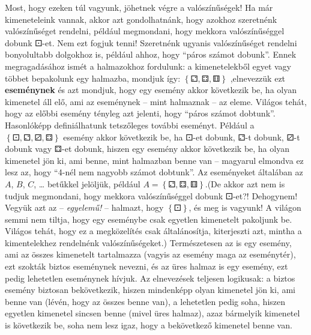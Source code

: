 \documentclass[magyar,]{book}
\begin{document}
Most, hogy ezeken túl vagyunk, jöhetnek végre a valószínűségek! Ha már kimeneteleink vannak, akkor azt gondolhatnánk, hogy azokhoz szeretnénk valószínűséget rendelni, például megmondani, hogy mekkora valószínűséggel dobunk ⚀-et. Nem ezt fogjuk tenni! Szeretnénk ugyanis valószínűséget rendelni bonyolultabb dolgokhoz is, például ahhoz, hogy \enquote{páros számot dobunk}. Ennek megragadásához ismét a halmazokhoz fordulunk: a kimenetelekből egyet vagy többet bepakolunk egy halmazba, mondjuk így: \(\left\{⚁,⚃,⚅\right\}\) ,elnevezzük ezt \textbf{eseménynek} és azt mondjuk, hogy egy esemény akkor következik be, ha olyan kimenetel áll elő, ami az eseménynek -- mint halmaznak -- az eleme. Világos tehát, hogy az előbbi esemény tényleg azt jelenti, hogy \enquote{páros számot dobtunk}. Hasonlóképp definiálhatunk tetszőleges további eseményt. Például a \(\left\{⚀,⚁,⚂,⚃\right\}\) esemény akkor következik be, ha ⚀-et dobunk, ⚁-t dobunk, ⚂-t dobunk vagy ⚃-et dobunk, hiszen egy esemény akkor következik be, ha olyan kimenetel jön ki, ami benne, mint halmazban benne van -- magyarul elmondva ez lesz az, hogy \enquote{4-nél nem nagyobb számot dobtunk}. Az eseményeket általában az \(A\), \(B\), \(C\), \ldots{} betűkkel jelöljük, például \(A=\left\{⚁,⚃,⚅\right\}\).(De akkor azt nem is tudjuk megmondani, hogy mekkora valószínűséggel dobunk ⚀-et?! Dehogynem! Vegyük azt az -- \emph{egyelemű!} -- halmazt, hogy \(\left\{⚀\right\}\), és meg is vagyunk! A világon semmi nem tiltja, hogy egy eseménybe csak egyetlen kimenetelt pakoljunk be. Világos tehát, hogy ez a megközelítés csak általánosítja, kiterjeszti azt, mintha a kimentelekhez rendelnénk valószínűségeket.) Természetesen az is egy esemény, ami az összes kimenetelt tartalmazza (vagyis az esemény maga az eseménytér), ezt szokták biztos eseménynek nevezni, és az üres halmaz is egy esemény, ezt pedig lehetetlen eseménynek hívjuk. Az elnevezések teljesen logikusak: a biztos esemény biztosan bekövetkezik, hiszen mindenképp olyan kimenetel jön ki, ami benne van (lévén, hogy az összes benne van), a lehetetlen pedig soha, hiszen egyetlen kimenetel sincsen benne (mivel üres halmaz), azaz bármelyik kimenetel is következik be, soha nem lesz igaz, hogy a bekövetkező kimenetel benne van.
\end{document}
